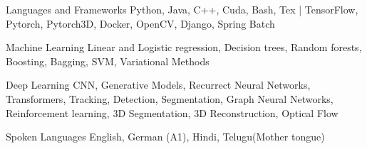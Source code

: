 
\begin{cvskills}
    \cvskill
    {Languages and Frameworks} %
    {Python, Java, C++, Cuda, Bash, Tex | TensorFlow, Pytorch, Pytorch3D, Docker, OpenCV, Django, Spring Batch} %
    
    \cvskill
    {Machine Learning} %
    {Linear and Logistic regression, Decision trees, Random forests, Boosting, Bagging, SVM, Variational Methods} %

    \cvskill
    {Deep Learning} %
    {CNN, Generative Models, Recurrect Neural Networks, Transformers, Tracking, Detection, Segmentation, \linebreak Graph Neural Networks, Reinforcement learning, 3D Segmentation, 3D Reconstruction, Optical Flow} %

    \cvskill
    {Spoken Languages} %
    {English, German (A1), Hindi, Telugu(Mother tongue)} %
    
\end{cvskills}
